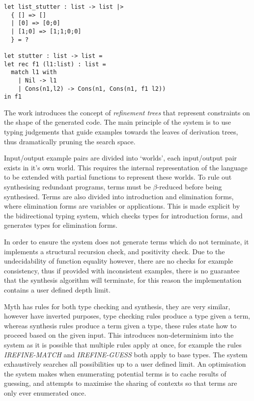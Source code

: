 \documentclass[a4paper]{article}
\begin{document}
\begin{center}
\begin{verbatim}
let list_stutter : list -> list |>
  { [] => []
  | [0] => [0;0]
  | [1;0] => [1;1;0;0]
  } = ?

let stutter : list -> list =
let rec f1 (l1:list) : list =
  match l1 with 
	| Nil -> l1
	| Cons(n1,l2) -> Cons(n1, Cons(n1, f1 l2))
in f1
\end{verbatim}
\end{center}

The work introduces the concept of \emph{refinement trees} that represent constraints on the shape of the generated code. 
The main principle of the system is to use typing judgements that guide examples towards the leaves of derivation trees,
thus dramatically pruning the search space.  

Input/output example pairs are divided into `worlds', each input/output pair exists in it's own world. This requires the internal representation 
of the language to be extended with partial functions to represent these worlds. 
To rule out synthesising redundant programs, terms must be \(\beta\)-reduced before being synthesised. Terms are also divided into introduction 
and elimination forms, where elimination forms are variables or applications. This is made explicit by the bidirectional typing system, 
which checks types for introduction forms, and generates types for elimination forms.

In order to ensure the system does not generate terms which do not terminate, it implements a structural recursion check, and positivity check.
Due to the undecidability of function equality however, there are no checks for example consistency, thus if provided with inconsistent examples, there
is no guarantee that the synthesis algorithm will terminate, for this reason the implementation contains a user defined depth limit. 

Myth has rules for both type checking and synthesis, they are very similar, however have inverted purposes, type checking rules produce a 
type given a term, whereas synthesis rules produce a term given a type, these rules state how to proceed based on the given input. This introduces
non-determinism into the system as it is possible that multiple rules apply at once, for example the rules \emph{IREFINE-MATCH} and \emph{IREFINE-GUESS} both 
apply to base types. The system exhaustively searches all possibilities up to a user defined limit. An optimisation the system makes when enumerating potential 
terms is to cache results of guessing, and attempts to maximise the sharing of contexts so that terms are only ever enumerated once. 
\end{document}
